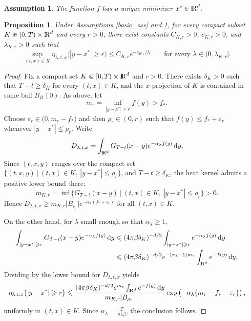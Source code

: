 \documentclass[10pt,a4paper]{amsart}
\newtheorem{assumption}{Assumption}
\newtheorem{proposition}{Proposition}
\def\R{\mathrm{I\kern-0.21emR}}
\renewcommand{\Vert}{|}
\newcommand{\dd}{\,\mathrm{d}}
\renewcommand{\geq}{\geqslant}
\renewcommand{\leq}{\leqslant}
\begin{document}
\begin{assumption}\label{unique_min}
The function $f$ has a unique minimizer $x^* \in \R^d$.
\end{assumption}

\begin{proposition}\label{conditional_mass_concentration}
Under Assumptions \ref{basic_ass} and \ref{unique_min}, for every compact subset $K \Subset [0,T) \times \R^d$ and every $r > 0$, there exist constants $C_{K,r} > 0$, $c_{K,r} > 0$, and $\lambda_{K,r} > 0$ such that
$$
\sup_{(t,x) \in K} \eta_{\lambda,t,x}\big( \Vert y - x^* \Vert \geq r \big) \leq C_{K,r} e^{-c_{K,r}/\lambda}
\qquad
\text{for every } \lambda \in (0,\lambda_{K,r}].
$$
\end{proposition}

\begin{proof}
Fix a compact set $K \Subset [0,T) \times \R^d$ and $r > 0$. There exists $\delta_K > 0$ such that $T-t \geq \delta_K$ for every $(t,x) \in K$, and the $x$-projection of $K$ is contained in some ball $B_R(0)$.
As above, let
$$
m_r = \inf_{\Vert y - x^* \Vert \geq r} f(y) > f_*.
$$
Choose $\varepsilon_r \in \big( 0, m_r - f_* \big)$ and then $\rho_r \in (0,r)$ such that $f(y) \leq f_* + \varepsilon_r$ whenever $\Vert y - x^* \Vert \leq \rho_r$.
Write
$$
D_{\lambda,t,x} = \int_{\R^d} G_{T-t}(x-y)e^{-\alpha_\lambda f(y)}\dd y.
$$
Since $(t,x,y)$ ranges over the compact set $\big\{ (t,x,y) \ \big\vert\ (t,x) \in K,\ \Vert y - x^* \Vert \leq \rho_r \big\}$, and $T-t \geq \delta_K$, the heat kernel admits a positive lower bound there:
$$
m_{K,r} = \inf \big\{ G_{T-t}(x-y) \ \big\vert\ (t,x) \in K,\ \Vert y - x^* \Vert \leq \rho_r \big\} > 0.
$$
Hence $D_{\lambda,t,x} \geq m_{K,r}\vert B_{\rho_r} \vert e^{-\alpha_\lambda(f_* + \varepsilon_r)}$ for all $(t,x) \in K$.

On the other hand, for $\lambda$ small enough so that $\alpha_\lambda \geq 1$,
\begin{align*}
\int_{\Vert y - x^* \Vert \geq r} G_{T-t}(x-y)e^{-\alpha_\lambda f(y)}\dd y
&\leq
(4\pi\beta\delta_K)^{-d/2}\int_{\Vert y - x^* \Vert \geq r} e^{-\alpha_\lambda f(y)}\dd y \\
&\leq
(4\pi\beta\delta_K)^{-d/2}e^{-(\alpha_\lambda - 1)m_r}\int_{\R^d} e^{-f(y)}\dd y.
\end{align*}
Dividing by the lower bound for $D_{\lambda,t,x}$ yields
$$
\eta_{\lambda,t,x}\big( \Vert y - x^* \Vert \geq r \big)
\leq
\frac{(4\pi\beta\delta_K)^{-d/2}e^{m_r}\int_{\R^d} e^{-f(y)}\dd y}{m_{K,r}\vert B_{\rho_r} \vert}
\exp \left( - \alpha_\lambda \big( m_r - f_* - \varepsilon_r \big) \right),
$$
uniformly in $(t,x) \in K$. Since $\displaystyle \alpha_\lambda = \frac{T}{2\lambda\beta}$, the conclusion follows.
\end{proof}
\end{document}
